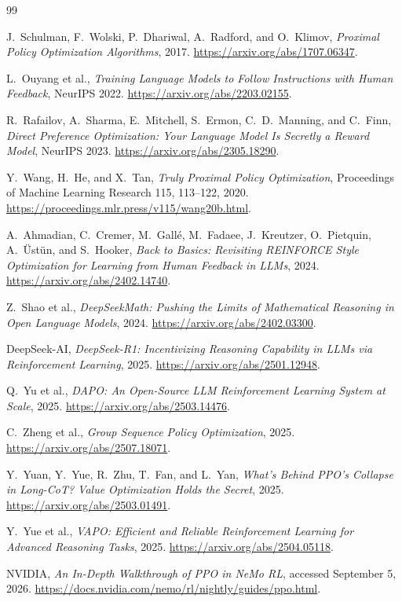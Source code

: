 \documentclass[11pt]{article}
\begin{document}
\newpage
\begin{thebibliography}{99}

J.~Schulman, F.~Wolski, P.~Dhariwal, A.~Radford, and O.~Klimov,
\emph{Proximal Policy Optimization Algorithms}, 2017.
\url{https://arxiv.org/abs/1707.06347}.

L.~Ouyang et al.,
\emph{Training Language Models to Follow Instructions with Human Feedback},
NeurIPS 2022.
\url{https://arxiv.org/abs/2203.02155}.

R.~Rafailov, A.~Sharma, E.~Mitchell, S.~Ermon, C.~D.~Manning, and C.~Finn,
\emph{Direct Preference Optimization: Your Language Model Is Secretly a
Reward Model}, NeurIPS 2023.
\url{https://arxiv.org/abs/2305.18290}.

Y.~Wang, H.~He, and X.~Tan,
\emph{Truly Proximal Policy Optimization},
Proceedings of Machine Learning Research 115, 113--122, 2020.
\url{https://proceedings.mlr.press/v115/wang20b.html}.

A.~Ahmadian, C.~Cremer, M.~Gall\'e, M.~Fadaee, J.~Kreutzer,
O.~Pietquin, A.~\"Ust\"un, and S.~Hooker,
\emph{Back to Basics: Revisiting REINFORCE Style Optimization for Learning
from Human Feedback in LLMs}, 2024.
\url{https://arxiv.org/abs/2402.14740}.

Z.~Shao et al.,
\emph{DeepSeekMath: Pushing the Limits of Mathematical Reasoning in Open
Language Models}, 2024.
\url{https://arxiv.org/abs/2402.03300}.

DeepSeek-AI,
\emph{DeepSeek-R1: Incentivizing Reasoning Capability in LLMs via
Reinforcement Learning}, 2025.
\url{https://arxiv.org/abs/2501.12948}.

Q.~Yu et al.,
\emph{DAPO: An Open-Source LLM Reinforcement Learning System at Scale}, 2025.
\url{https://arxiv.org/abs/2503.14476}.

C.~Zheng et al.,
\emph{Group Sequence Policy Optimization}, 2025.
\url{https://arxiv.org/abs/2507.18071}.

Y.~Yuan, Y.~Yue, R.~Zhu, T.~Fan, and L.~Yan,
\emph{What's Behind PPO's Collapse in Long-CoT? Value Optimization Holds the
Secret}, 2025.
\url{https://arxiv.org/abs/2503.01491}.

Y.~Yue et al.,
\emph{VAPO: Efficient and Reliable Reinforcement Learning for Advanced
Reasoning Tasks}, 2025.
\url{https://arxiv.org/abs/2504.05118}.

NVIDIA,
\emph{An In-Depth Walkthrough of PPO in NeMo RL}, accessed September 5, 2026.
\url{https://docs.nvidia.com/nemo/rl/nightly/guides/ppo.html}.

\end{thebibliography}
\end{document}

